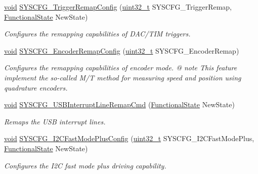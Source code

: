 \begin{DoxyCompactItemize}
\hyperlink{group___n_a_m_e_ga18028b8badbf1ea7e704ccac3c488e82}{void} \hyperlink{group___s_y_s_c_f_g___group1_gaff2b19506dad30a4906c62c39e812db7}{S\-Y\-S\-C\-F\-G\-\_\-\-Trigger\-Remap\-Config} (\hyperlink{stdint_8h_a435d1572bf3f880d55459d9805097f62}{uint32\-\_\-t} S\-Y\-S\-C\-F\-G\-\_\-\-Trigger\-Remap, \hyperlink{group___exported__types_gac9a7e9a35d2513ec15c3b537aaa4fba1}{Functional\-State} New\-State)
\begin{DoxyCompactList}\small\item\em Configures the remapping capabilities of D\-A\-C/\-T\-I\-M triggers. \end{DoxyCompactList}\item 
\hyperlink{group___n_a_m_e_ga18028b8badbf1ea7e704ccac3c488e82}{void} \hyperlink{group___s_y_s_c_f_g___group1_gaa54ce96de541bfd966b33b7b48374c7e}{S\-Y\-S\-C\-F\-G\-\_\-\-Encoder\-Remap\-Config} (\hyperlink{stdint_8h_a435d1572bf3f880d55459d9805097f62}{uint32\-\_\-t} S\-Y\-S\-C\-F\-G\-\_\-\-Encoder\-Remap)
\begin{DoxyCompactList}\small\item\em Configures the remapping capabilities of encoder mode. @ note This feature implement the so-\/called M/\-T method for measuring speed and position using quadrature encoders. \end{DoxyCompactList}\item 
\hyperlink{group___n_a_m_e_ga18028b8badbf1ea7e704ccac3c488e82}{void} \hyperlink{group___s_y_s_c_f_g___group1_ga35ab0d9952cf39679bcece620b575178}{S\-Y\-S\-C\-F\-G\-\_\-\-U\-S\-B\-Interrupt\-Line\-Remap\-Cmd} (\hyperlink{group___exported__types_gac9a7e9a35d2513ec15c3b537aaa4fba1}{Functional\-State} New\-State)
\begin{DoxyCompactList}\small\item\em Remaps the U\-S\-B interrupt lines. \end{DoxyCompactList}\item 
\hyperlink{group___n_a_m_e_ga18028b8badbf1ea7e704ccac3c488e82}{void} \hyperlink{group___s_y_s_c_f_g___group1_ga64382aaf7dab2743c61cfdc69401fe7b}{S\-Y\-S\-C\-F\-G\-\_\-\-I2\-C\-Fast\-Mode\-Plus\-Config} (\hyperlink{stdint_8h_a435d1572bf3f880d55459d9805097f62}{uint32\-\_\-t} S\-Y\-S\-C\-F\-G\-\_\-\-I2\-C\-Fast\-Mode\-Plus, \hyperlink{group___exported__types_gac9a7e9a35d2513ec15c3b537aaa4fba1}{Functional\-State} New\-State)
\begin{DoxyCompactList}\small\item\em Configures the I2\-C fast mode plus driving capability. \end{DoxyCompactList}\item 

\end{DoxyCompactItemize}
